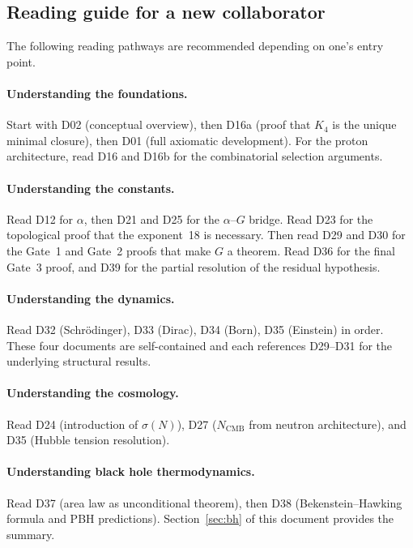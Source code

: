 \documentclass[11pt,a4paper]{article}
\theoremstyle{plain}
\theoremstyle{definition}
\theoremstyle{remark}
\newcommand{\Kfour}{K_4}
\newcommand{\sigmaN}{\sigma(N)}
\begin{document}
\subsection{Reading guide for a new collaborator}
\label{subsec:reading_guide}

The following reading pathways are recommended depending on one's entry point.

\paragraph{Understanding the foundations.}
Start with D02 (conceptual overview), then D16a (proof that $\Kfour$ is the unique minimal closure), then D01 (full axiomatic development).
For the proton architecture, read D16 and D16b for the combinatorial selection arguments.

\paragraph{Understanding the constants.}
Read D12 for $\alpha$, then D21 and D25 for the $\alpha$--$G$ bridge.
Read D23 for the topological proof that the exponent~18 is necessary.
Then read D29 and D30 for the Gate~1 and Gate~2 proofs that make $G$ a theorem.
Read D36 for the final Gate~3 proof, and D39 for the partial resolution of the residual hypothesis.

\paragraph{Understanding the dynamics.}
Read D32 (Schr\"odinger), D33 (Dirac), D34 (Born), D35 (Einstein) in order.
These four documents are self-contained and each references D29--D31 for the underlying structural results.

\paragraph{Understanding the cosmology.}
Read D24 (introduction of $\sigmaN$), D27 ($N_{\mathrm{CMB}}$ from neutron architecture), and D35 (Hubble tension resolution).

\paragraph{Understanding black hole thermodynamics.}
Read D37 (area law as unconditional theorem), then D38 (Bekenstein--Hawking formula and PBH predictions).
Section~\ref{sec:bh} of this document provides the summary.
\end{document}
